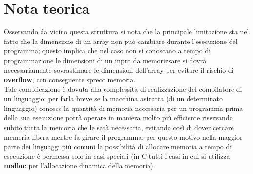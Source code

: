 \section{Nota teorica}
Osservando da vicino questa struttura si nota che la principale limitazione sta nel fatto che la dimensione di un array non può cambiare durante l'esecuzione del programma; questo implica che nel caso non si conoscano a tempo di programmazione le dimensioni di un input da memorizzare si dovrà necessariamente sovrastimare le dimensioni dell'array per evitare il rischio di \textbf{overflow}, con conseguente spreco memoria.\\ 
Tale complicazione è dovuta alla complessità di realizzazione del compilatore di un linguaggio: per farla breve se la macchina astratta (di un determinato linguaggio) conosce la quantità di memoria necessaria per un programma prima della sua esecuzione 
potrà operare in maniera molto più efficiente riservando subito tutta la memoria che le sarà necessaria, evitando così di dover cercare memoria libera mentre fa girare il programma; per questo motivo nella maggior parte dei linguaggi più comuni la possibilità di allocare memoria a tempo di esecuzione è permessa solo in casi speciali (in C tutti i casi in cui si utilizza \textbf{malloc} per l'allocazione dinamica della memoria).